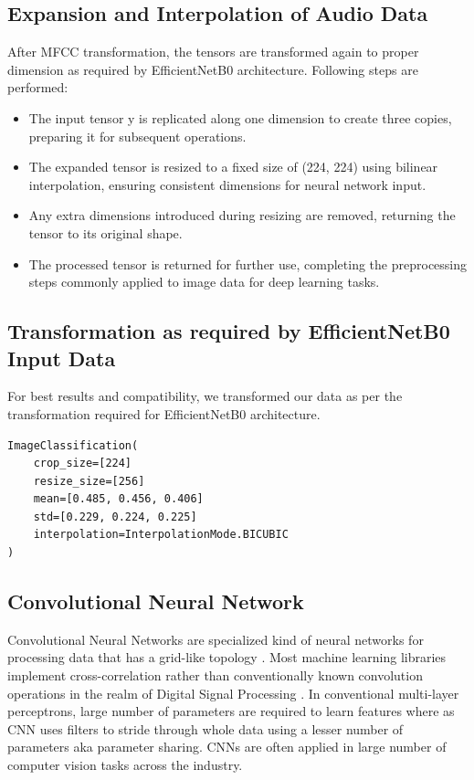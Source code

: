 \documentclass[fleqn, 10pt, twoside]{IOEGC}
\begin{document}
\subsection{Expansion and Interpolation of Audio Data}
After MFCC transformation, the tensors are transformed again to proper dimension as required by EfficientNetB0 architecture. Following steps are performed:
\begin{itemize}
	\item The input tensor y is replicated along one dimension to create three copies, preparing it for subsequent operations.
	\item The expanded tensor is resized to a fixed size of (224, 224) using bilinear interpolation, ensuring consistent dimensions for neural network input.
	\item Any extra dimensions introduced during resizing are removed, returning the tensor to its original shape.
	\item The processed tensor is returned for further use, completing the preprocessing steps commonly applied to image data for deep learning tasks.
\end{itemize}


\subsection{Transformation as required by EfficientNetB0 Input Data}
For best results and compatibility, we transformed our data as per the transformation required for EfficientNetB0 architecture.
\begin{lstlisting}[style=mystyle,caption={MFCC Transformation Function},captionpos=b]
ImageClassification(
    crop_size=[224]
    resize_size=[256]
    mean=[0.485, 0.456, 0.406]
    std=[0.229, 0.224, 0.225]
    interpolation=InterpolationMode.BICUBIC
)
\end{lstlisting}
\subsection{ Convolutional Neural Network}
Convolutional Neural Networks are specialized kind of neural networks for processing
data that has a grid-like topology \cite{r8}. Most machine learning libraries implement cross-correlation rather than conventionally known convolution operations in the realm of Digital
Signal Processing . In conventional multi-layer perceptrons, large number of parameters are required to learn features where as CNN uses filters to stride through whole data using a lesser number of parameters aka parameter sharing. CNNs are often applied
in large number of computer vision tasks across the industry.
\end{document}
